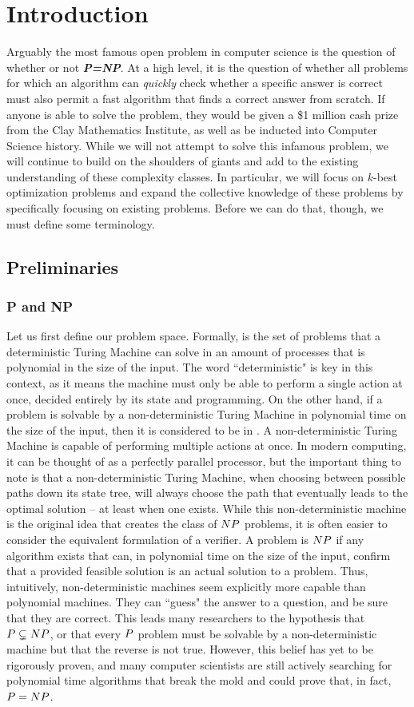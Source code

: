 \chapter{Introduction}
Arguably the most famous open problem in computer science is the question of whether or not \textit{\textbf{P=NP}}. At a high level, it is the question of whether all problems for which an algorithm can \textit{quickly} check whether a specific answer is correct must also permit a fast algorithm that finds a correct answer from scratch. If anyone is able to solve the problem, they would be given a \$1 million cash prize from the Clay Mathematics Institute, as well as be inducted into Computer Science history. While we will not attempt to solve this infamous problem, we will continue to build on the shoulders of giants and add to the existing understanding of these complexity classes. In particular, we will focus on $k$-best optimization problems and expand the collective knowledge of these problems by specifically focusing on existing \nph{} problems. Before we can do that, though, we must define some terminology.
\section{Preliminaries}
\subsection{P and NP}
Let us first define our problem space. Formally, \textit{\textbf{\pp{}}} is the set of problems that a deterministic Turing Machine can solve in an amount of processes that is polynomial in the size of the input. The word ``deterministic" is key in this context, as it means the machine must only be able to perform a single action at once, decided entirely by its state and programming. On the other hand, if a problem is solvable by a non-deterministic Turing Machine in polynomial time on the size of the input, then it is considered to be in \textit{\textbf{\np{}}}. A non-deterministic Turing Machine is capable of performing multiple actions at once. In modern computing, it can be thought of as a perfectly parallel processor, but the important thing to note is that a non-deterministic Turing Machine, when choosing between possible paths down its state tree, will always choose the path that eventually leads to the optimal solution -- at least when one exists. While this non-deterministic machine is the original idea that creates the class of ${NP}{}$ problems, it is often easier to consider the equivalent formulation of a verifier. A problem is ${NP}{}$ if any algorithm exists that can, in polynomial time on the size of the input, confirm that a provided feasible solution is an actual solution to a problem. Thus, intuitively, non-deterministic machines seem explicitly more capable than polynomial machines. They can ``guess" the answer to a question, and be sure that they are correct. This leads many researchers to the hypothesis that ${P}{} \subsetneq {NP}{}$, or that every ${P}{}$ problem must be solvable by a non-deterministic machine but that the reverse is not true. However, this belief has yet to be rigorously proven, and many computer scientists are still actively searching for polynomial time algorithms that break the mold and could prove that, in fact, ${P}{} = {NP}{}$. 
